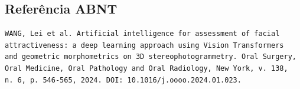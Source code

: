 \subsection{Referência ABNT}
\begin{verbatim}
WANG, Lei et al. Artificial intelligence for assessment of facial
attractiveness: a deep learning approach using Vision Transformers
and geometric morphometrics on 3D stereophotogrammetry. Oral Surgery,
Oral Medicine, Oral Pathology and Oral Radiology, New York, v. 138,
n. 6, p. 546-565, 2024. DOI: 10.1016/j.oooo.2024.01.023.
\end{verbatim}
\endinput
